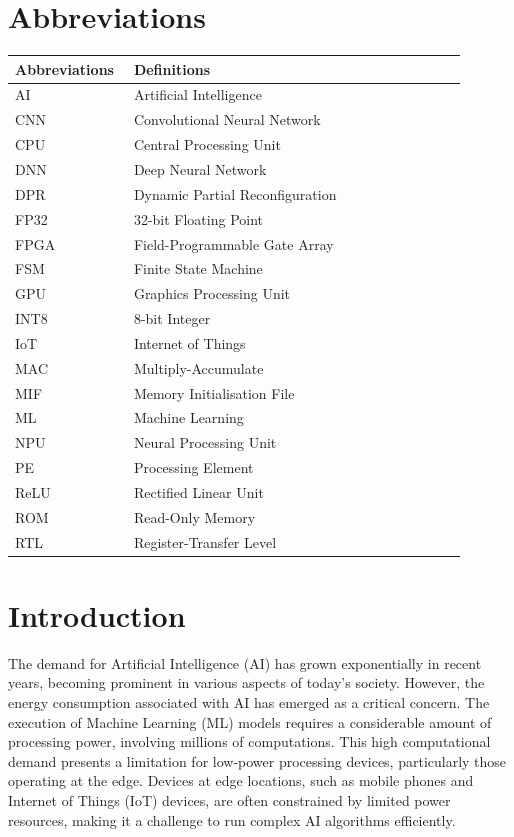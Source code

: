 \documentclass[12pt, a4paper, ukenglish]{article}
\begin{document}
\section*{Abbreviations}

\begin{longtable}{p{0.25\linewidth} p{0.70\linewidth}}
    \toprule
    \textbf{Abbreviations} & \textbf{Definitions} \\
    \midrule
    \endhead
    AI & Artificial Intelligence \\
    CNN & Convolutional Neural Network \\
    CPU & Central Processing Unit \\
    DNN & Deep Neural Network \\
    DPR & Dynamic Partial Reconfiguration \\
    FP32 & 32-bit Floating Point \\
    FPGA & Field-Programmable Gate Array \\
    FSM & Finite State Machine \\ 
    GPU & Graphics Processing Unit \\
    INT8 & 8-bit Integer \\
    IoT & Internet of Things \\
    MAC & Multiply-Accumulate \\
    MIF & Memory Initialisation File \\
    ML & Machine Learning \\
    NPU & Neural Processing Unit \\
    PE & Processing Element \\
    ReLU & Rectified Linear Unit \\
    ROM & Read-Only Memory \\
    RTL & Register-Transfer Level \\


    \bottomrule
\end{longtable}
\addtocounter{table}{-1}

\printnomenclature

\clearpage
\setlength{\parskip}{9pt}
\section{Introduction} \label{sec: intro}
    
    The demand for Artificial Intelligence (AI) has grown exponentially in recent years, becoming prominent in various aspects of today's society. However, the energy consumption associated with AI has emerged as a critical concern. The execution of Machine Learning (ML) models requires a considerable amount of processing power, involving millions of computations. This high computational demand presents a limitation for low-power processing devices, particularly those operating at the edge. Devices at edge locations, such as mobile phones and Internet of Things (IoT) devices, are often constrained by limited power resources, making it a challenge to run complex AI algorithms efficiently. 
    
\end{document}
